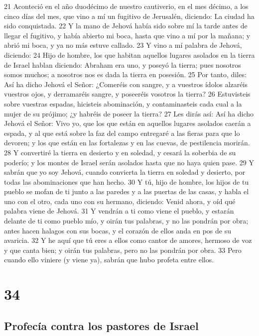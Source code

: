 21 Aconteció en el año duodécimo de nuestro cautiverio, en el mes décimo, a los cinco días del mes, que vino a mí un fugitivo de Jerusalén, diciendo: La ciudad ha sido conquistada. 
22 Y la mano de Jehová había sido sobre mí la tarde antes de llegar el fugitivo, y había abierto mi boca, hasta que vino a mí por la mañana; y abrió mi boca, y ya no más estuve callado.
23 Y vino a mí palabra de Jehová, diciendo:
24 Hijo de hombre, los que habitan aquellos lugares asolados en la tierra de Israel hablan diciendo: Abraham era uno, y poseyó la tierra; pues nosotros somos muchos; a nosotros nos es dada la tierra en posesión.
25 Por tanto, diles: Así ha dicho Jehová el Señor: ¿Comeréis con sangre, y a vuestros ídolos alzaréis vuestros ojos, y derramaréis sangre, y poseeréis vosotros la tierra?
26 Estuvisteis sobre vuestras espadas, hicisteis abominación, y contaminasteis cada cual a la mujer de su prójimo; ¿y habréis de poseer la tierra?
27 Les dirás así: Así ha dicho Jehová el Señor: Vivo yo, que los que están en aquellos lugares asolados caerán a espada, y al que está sobre la faz del campo entregaré a las fieras para que lo devoren; y los que están en las fortalezas y en las cuevas, de pestilencia morirán.
28 Y convertiré la tierra en desierto y en soledad, y cesará la soberbia de su poderío; y los montes de Israel serán asolados hasta que no haya quien pase.
29 Y sabrán que yo soy Jehová, cuando convierta la tierra en soledad y desierto, por todas las abominaciones que han hecho.
30 Y tú, hijo de hombre, los hijos de tu pueblo se mofan de ti junto a las paredes y a las puertas de las casas, y habla el uno con el otro, cada uno con su hermano, diciendo: Venid ahora, y oíd qué palabra viene de Jehová.
31 Y vendrán a ti como viene el pueblo, y estarán delante de ti como pueblo mío, y oirán tus palabras, y no las pondrán por obra; antes hacen halagos con sus bocas, y el corazón de ellos anda en pos de su avaricia.
32 Y he aquí que tú eres a ellos como cantor de amores, hermoso de voz y que canta bien; y oirán tus palabras, pero no las pondrán por obra.
33 Pero cuando ello viniere (y viene ya), sabrán que hubo profeta entre ellos.

\chapter{34}

\section*{Profecía contra los pastores de Israel }

